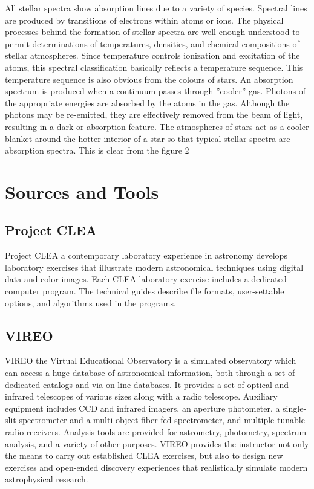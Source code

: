 \documentclass[letterpaper,11pt]{report}
\begin{document}
All stellar spectra show absorption lines due to a variety of species. Spectral lines are produced by transitions of electrons within atoms or ions. The physical processes behind the formation of stellar spectra are well
enough understood to permit determinations of temperatures, densities, and chemical compositions of stellar
atmospheres. Since temperature controls ionization and excitation of the atoms, this spectral classification basically reflects a temperature sequence. This temperature sequence is also obvious from the colours of stars. An
absorption spectrum is produced when a continuum passes through ”cooler” gas. Photons of the appropriate
energies are absorbed by the atoms in the gas. Although the photons may be re-emitted, they are effectively
removed from the beam of light, resulting in a dark or absorption feature. The atmospheres of stars act as a
cooler blanket around the hotter interior of a star so that typical stellar spectra are absorption spectra. This is
clear from the figure 2

\section{Sources and Tools}

\subsection{Project CLEA}
Project CLEA a contemporary laboratory experience in astronomy develops laboratory exercises that
illustrate modern astronomical techniques using digital data and color images. Each CLEA laboratory
exercise includes a dedicated computer program. The technical guides describe file formats, user-settable
options, and algorithms used in the programs.

\subsection{VIREO}
VIREO the Virtual Educational Observatory is a simulated observatory which can access a huge database
of astronomical information, both through a set of dedicated catalogs and via on-line databases. It provides
a set of optical and infrared telescopes of various sizes along with a radio telescope. Auxiliary equipment
includes CCD and infrared imagers, an aperture photometer, a single-slit spectrometer and a multi-object
fiber-fed spectrometer, and multiple tunable radio receivers. Analysis tools are provided for astrometry,
photometry, spectrum analysis, and a variety of other purposes. VIREO provides the instructor not only
the means to carry out established CLEA exercises, but also to design new exercises and open-ended
discovery experiences that realistically simulate modern astrophysical research.
\end{document}
